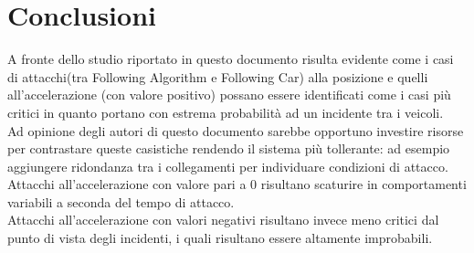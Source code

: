 \section{Conclusioni}
A fronte dello studio riportato in questo documento risulta evidente come i casi di attacchi(tra Following Algorithm e Following Car) alla posizione e quelli all'accelerazione (con valore positivo) possano essere identificati come i casi più critici in quanto portano con estrema probabilità ad un incidente tra i veicoli. \\
Ad opinione degli autori di questo documento sarebbe opportuno investire risorse per contrastare queste casistiche rendendo il sistema più tollerante: ad esempio aggiungere ridondanza tra i collegamenti per individuare condizioni di attacco. \\
Attacchi all'accelerazione con valore pari a 0 risultano scaturire in comportamenti variabili a seconda del tempo di attacco.\\
Attacchi all'accelerazione con valori negativi risultano invece meno critici dal punto di vista degli incidenti, i quali risultano essere altamente improbabili.